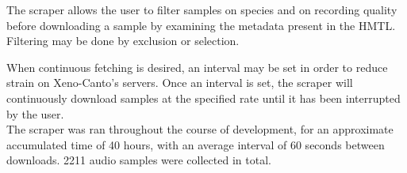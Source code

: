 The scraper allows the user to filter samples on species and on recording quality
before downloading a sample by examining the metadata present in the HMTL.
Filtering may be done by exclusion or selection.

When continuous fetching is desired, an interval may be set in order to reduce
strain on Xeno-Canto's servers.
Once an interval is set, the scraper will continuously download samples
at the specified rate until it has been interrupted by the user.\\

The scraper was ran throughout the course of development, for an approximate
accumulated time of 40 hours, with an average interval of 60 seconds between
downloads.
2211 audio samples were collected in total.

